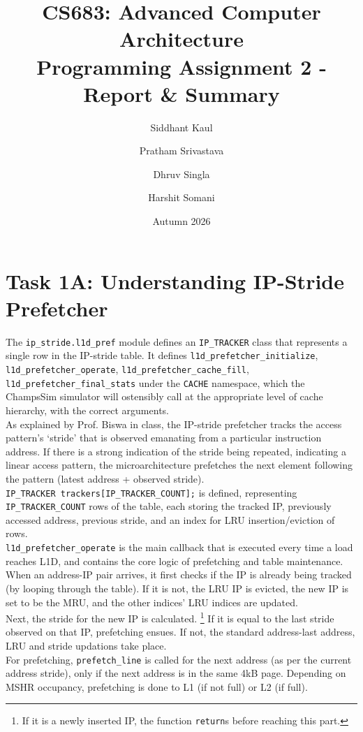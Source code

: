 \documentclass[11pt]{article}
\title{\textbf{CS683: Advanced Computer Architecture} \\
Programming Assignment 2 - Report \& Summary}
\author{Siddhant Kaul \and Pratham Srivastava \and Dhruv Singla \and Harshit Somani}
\date{Autumn 2026}
\begin{document}

\maketitle

\clearpage
{}
\thispagestyle{empty}
\tableofcontents
\clearpage
\section{Task 1A: Understanding IP-Stride Prefetcher}
The \texttt{ip\_stride.l1d\_pref} module defines an \texttt{IP\_TRACKER} class that represents a single row in the IP-stride table. It defines \verb|l1d_prefetcher_initialize|, \verb|l1d_prefetcher_operate|, \verb|l1d_prefetcher_cache_fill|, \verb|l1d_prefetcher_final_stats| under the \verb|CACHE| namespace, which the ChampsSim simulator will ostensibly call at the appropriate level of cache hierarchy, with the correct arguments.
\\
As explained by Prof. Biswa in class, the IP-stride prefetcher tracks the access pattern's `stride' that is observed emanating from a particular instruction address. If there is a strong indication of the stride being repeated, indicating a linear access pattern, the microarchitecture prefetches the next element following the pattern (latest address + observed stride).
\\
\verb|IP_TRACKER trackers[IP_TRACKER_COUNT];| is defined, representing \verb|IP_TRACKER_COUNT| rows of the table, each storing the tracked IP, previously accessed address, previous stride, and an index for LRU insertion/eviction of rows.
\\
\verb|l1d_prefetcher_operate| is the main callback that is executed every time a load reaches L1D, and contains the core logic of prefetching and table maintenance. When an address-IP pair arrives, it first checks if the IP is already being tracked (by looping through the table). If it is not, the LRU IP is evicted, the new IP is set to be the MRU, and the other indices' LRU indices are updated.
\\
Next, the stride for the new IP is calculated. \footnote{If it is a newly inserted IP, the function \texttt{return}s before reaching this part.} If it is equal to the last stride observed on that IP, prefetching ensues. If not, the standard address-last address, LRU and stride updations take place.
\\
For prefetching, \verb|prefetch_line| is called for the next address (as per the current address stride), only if the next address is in the same 4kB page. Depending on MSHR occupancy, prefetching is done to L1 (if not full) or L2 (if full).
\end{document}
